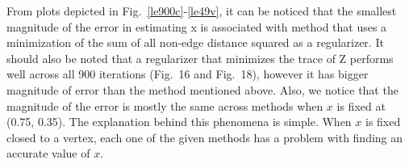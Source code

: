 \documentclass[answers]{exam}
\begin{document}
    From plots depicted in Fig.~\ref{le900c}-\ref{le49v}, it can be noticed that the smallest magnitude of the error in estimating x is associated with method that uses a minimization of the sum of all non-edge distance squared as a regularizer. It should also be noted that a regularizer that minimizes the trace of Z performs well across all 900 iterations (Fig.~16 and Fig.~18), however it has bigger magnitude of error than the method mentioned above. Also, we notice that the magnitude of the error is mostly the same across methods when $x$ is fixed at (0.75, 0.35). The explanation behind this phenomena is simple. When $x$ is fixed closed to a vertex, each one of the given methods has a problem with finding an accurate value of $x$.
    
 
    
    
    
\end{document}
